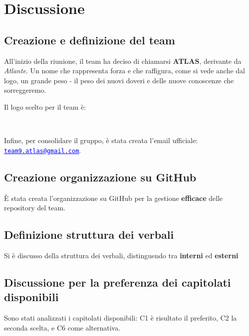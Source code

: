 \documentclass[a4paper,12pt]{article}
\makeatletter
\newcommand{\Email}{\href{mailto:team9.atlas@gmail.com}{\textcolor{blue}{\underline{team9.atlas@gmail.com}}}}
\newcommand{\LogoGruppo}{img/AtlasLogo.png} %
\makeatother
\begin{document}
\section{Discussione}{
    \subsection{Creazione e definizione del team}{
        All'inizio della riunione, il team ha deciso di chiamarsi \textbf{ATLAS}, derivante da \emph{Atlante}.  
        Un nome che rappresenta forza e che raffigura, come si vede anche dal logo, un grande peso - il peso dei nuovi doveri e delle nuove conoscenze che sorreggeremo.

        Il logo scelto per il team è:

        \begin{center}  
            \\
        \end{center}

        Infine, per consolidare il gruppo, è stata creata l'email ufficiale: \texttt{\Email}.
    }

    \subsection{Creazione organizzazione su GitHub}{
        È stata creata l'organizzazione su GitHub per la gestione \textbf{efficace} delle repository del team. 
    }

    \subsection{Definizione struttura dei verbali}{
        Si è discusso della struttura dei verbali, distinguendo tra \textbf{interni} ed \textbf{esterni}
    }

    \subsection{Discussione per la preferenza dei capitolati disponibili}{
        Sono stati analizzati i capitolati disponibili: C1 è risultato il preferito, C2 la seconda scelta, e C6 come alternativa.  
    }

}
\end{document}
